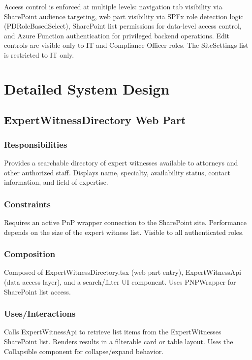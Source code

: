 \documentclass[12pt]{article}
\begin{document}
Access control is enforced at multiple levels: navigation tab visibility via SharePoint audience targeting, web part visibility via SPFx role detection logic (PDRoleBasedSelect), SharePoint list permissions for data-level access control, and Azure Function authentication for privileged backend operations. Edit controls are visible only to IT and Compliance Officer roles. The SiteSettings list is restricted to IT only.

\section{Detailed System Design}

\subsection{ExpertWitnessDirectory Web Part}

\subsubsection{Responsibilities}

Provides a searchable directory of expert witnesses available to attorneys and other authorized staff. Displays name, specialty, availability status, contact information, and field of expertise.

\subsubsection{Constraints}

Requires an active PnP wrapper connection to the SharePoint site. Performance depends on the size of the expert witness list. Visible to all authenticated roles.

\subsubsection{Composition}

Composed of ExpertWitnessDirectory.tsx (web part entry), ExpertWitnessApi (data access layer), and a search/filter UI component. Uses PNPWrapper for SharePoint list access.

\subsubsection{Uses/Interactions}

Calls ExpertWitnessApi to retrieve list items from the ExpertWitnesses SharePoint list. Renders results in a filterable card or table layout. Uses the Collapsible component for collapse/expand behavior.
\end{document}
